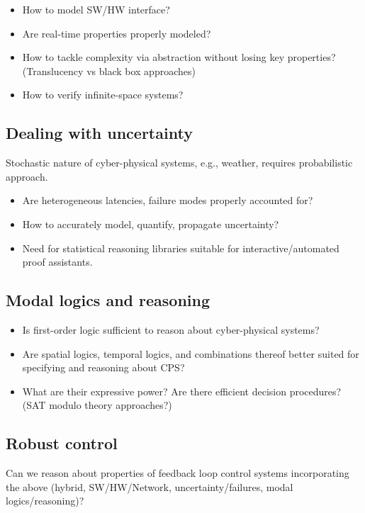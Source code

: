 \documentclass[
graybox,
envcountchap
]{svmult}
\begin{document}
\begin{bibunit}
    \begin{itemize}
    \item How to model SW/HW interface?
    \item Are real-time properties properly modeled?
    \item  How to tackle complexity via abstraction without losing key properties?  (Translucency vs black box approaches)
    \item How to verify infinite-space systems?
    \end{itemize}

    \subsection{Dealing with uncertainty}

    Stochastic nature of cyber-physical systems, e.g., weather, requires probabilistic approach.
    
    \begin{itemize}
    \item Are heterogeneous latencies, failure modes properly accounted for?
    \item How to accurately model, quantify, propagate uncertainty?
    \item Need for statistical reasoning libraries suitable for interactive/automated proof assistants.
    \end{itemize}

    \subsection{Modal logics and reasoning}
    
    \begin{itemize}
    \item  Is first-order logic sufficient to reason about cyber-physical systems?
    \item Are spatial logics, temporal logics, and combinations thereof better suited for specifying and reasoning about CPS?
    \item What are their expressive power?   Are there efficient decision procedures?  (SAT modulo theory approaches?)
    \end{itemize}

    \subsection{Robust control}

    Can we reason about properties of feedback loop control systems incorporating the above (hybrid, SW/HW/Network, uncertainty/failures, modal logics/reasoning)?
    

\end{bibunit}
\end{document}
